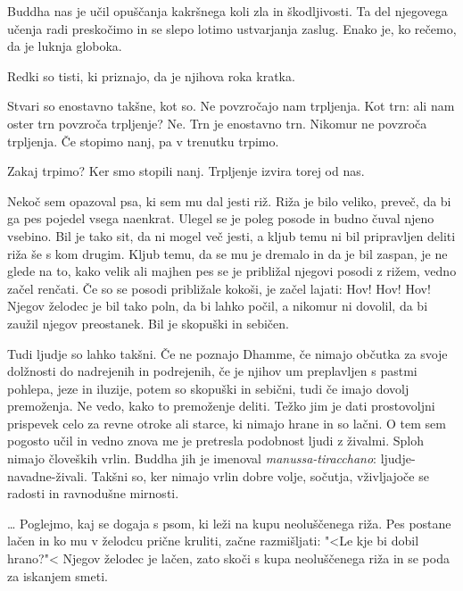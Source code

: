 Buddha nas je učil opuščanja kakršnega koli zla in škodljivosti. Ta del njegovega učenja radi preskočimo in se slepo lotimo ustvarjanja zaslug. Enako je, ko rečemo, da je luknja globoka.

Redki so tisti, ki priznajo, da je njihova roka kratka.


Stvari so enostavno takšne, kot so. Ne povzročajo nam trpljenja. Kot trn: ali nam oster trn povzroča trpljenje? Ne. Trn je enostavno trn. Nikomur ne povzroča trpljenja. Če stopimo nanj, pa v trenutku trpimo.

Zakaj trpimo? Ker smo stopili nanj. Trpljenje izvira torej od nas.

\clearpage


Nekoč sem opazoval psa, ki sem mu dal jesti riž. Riža je bilo veliko, preveč, da bi ga pes pojedel vsega naenkrat. Ulegel se je poleg posode in budno čuval njeno vsebino. Bil je tako sit, da ni mogel več jesti, a kljub temu ni bil pripravljen deliti riža še s kom drugim. Kljub temu, da se mu je dremalo in da je bil zaspan, je ne glede na to, kako velik ali majhen pes se je približal njegovi posodi z rižem, vedno začel renčati. Če so se posodi približale kokoši, je začel lajati: Hov! Hov! Hov! Njegov želodec je bil tako poln, da bi lahko počil, a nikomur ni dovolil, da bi zaužil njegov preostanek. Bil je skopuški in sebičen.

Tudi ljudje so lahko takšni. Če ne poznajo Dhamme, če nimajo občutka za svoje dolžnosti do nadrejenih in podrejenih, če je njihov um preplavljen s pastmi pohlepa, jeze in iluzije, potem so skopuški in sebični, tudi če imajo dovolj premoženja. Ne vedo, kako to premoženje deliti. Težko jim je dati prostovoljni prispevek celo za revne otroke ali starce, ki nimajo hrane in so lačni. O tem sem pogosto učil in vedno znova me je pretresla podobnost ljudi z živalmi. Sploh nimajo človeških vrlin. Buddha jih je imenoval \emph{manussa-tiracchano}: ljudje-navadne-živali. Takšni so, ker nimajo vrlin dobre volje, sočutja, vživljajoče se radosti in ravnodušne mirnosti.

\clearpage


\ldots{} Poglejmo, kaj se dogaja s psom, ki leži na kupu neoluščenega riža. Pes postane lačen in ko mu v želodcu prične kruliti, začne razmišljati: "<Le kje bi dobil hrano?"< Njegov želodec je lačen, zato skoči s kupa neoluščenega riža in se poda za iskanjem smeti.


